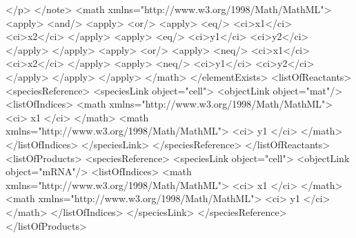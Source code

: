 \documentclass{cekarticle}
\begin{document}
\begin{example}
                    </p>
                </note>                
                <math xmlns="http://www.w3.org/1998/Math/MathML">
                    <apply>
                        <and/>
                        <apply>
                            <or/>
                            <apply>
                                <eq/>
                                <ci>x1</ci>
                                <ci>x2</ci>
                            </apply>
                            <apply>
                                <eq/>
                                <ci>y1</ci>
                                <ci>y2</ci>
                            </apply>
                        </apply>
                        <apply>
                            <or/>
                            <apply>
                                <neq/>
                                <ci>x1</ci>
                                <ci>x2</ci>
                            </apply>
                            <apply>
                                <neq/>
                                <ci>y1</ci>
                                <ci>y2</ci>
                            </apply>
                        </apply>
                    </apply>
                </math>
            </elementExists>
            <listOfReactants>
                <speciesReference>
                    <speciesLink object="cell">
                        <objectLink object="mat"/>
                        <listOfIndices>
                            <math xmlns="http://www.w3.org/1998/Math/MathML">
                                <ci> x1 </ci>
                            </math>
                            <math xmlns="http://www.w3.org/1998/Math/MathML">
                                <ci> y1 </ci>
                            </math>
                        </listOfIndices>
                    </speciesLink>
                </speciesReference>
            </listOfReactants>
            <listOfProducts>
                <speciesReference>
                    <speciesLink object="cell">
                        <objectLink object="mRNA"/>
                        <listOfIndices>
                            <math xmlns="http://www.w3.org/1998/Math/MathML">
                                <ci> x1 </ci>
                            </math>
                            <math xmlns="http://www.w3.org/1998/Math/MathML">
                                <ci> y1 </ci>
                            </math>
                        </listOfIndices>
                    </speciesLink>
                </speciesReference>
            </listOfProducts>

\end{example}
\end{document}
